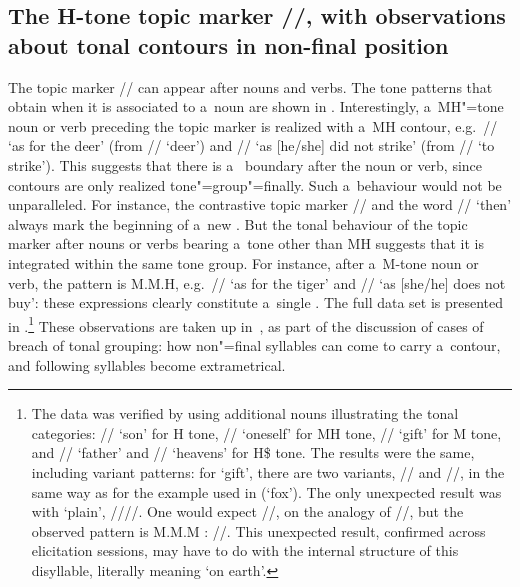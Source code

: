 \subsection[A~H-tone morpheme]{The H-tone topic marker //, with observations about tonal contours in non-final position}
\label{sec:theambivalentbehaviouroftheltonetopicmarker}
\largerpage%
The topic marker // can appear after nouns and verbs. The tone patterns that obtain when it is associated to a~noun are shown in . Interestingly, a~MH"=tone noun or verb preceding the topic marker is realized with a~MH contour, e.g.~//
‘as for the deer’ (from // ‘deer’) and // ‘as [he/she] did not strike’
(from // ‘to strike’). This suggests that there is a~ boundary after the noun or
verb, since contours are only realized tone"=group"=finally. Such a~behaviour would not be
unparalleled. For instance, the contrastive topic marker // and the word // ‘then’ always
mark the beginning of a~new . But the
tonal behaviour of the topic marker after nouns or verbs bearing a~tone other than MH suggests that it is integrated within the same tone
group. For instance, after a~M-tone noun or verb, the pattern is M.M.H, e.g.~// ‘as for
the tiger’ and // ‘as [she/he] does not buy’: these expressions clearly constitute a~single . The full data set is presented in .\footnote{The data was verified by using additional nouns
  illustrating the tonal categories: // ‘son’ for H tone, // ‘oneself’ for MH tone,
  // ‘gift’ for M tone, and // ‘father’ and // ‘heavens’ for H\$ tone. The results were the same, including variant patterns: for ‘gift’, there are two variants,
  // and //, in the same way as for the example used in  (‘fox’). The only
  unexpected result was with ‘plain’, ////. One would expect //, on the {analogy} of //, but the observed pattern is M.M.M : //. This
  unexpected result, confirmed across elicitation sessions, may have to do with the internal
  structure of this disyllable, literally meaning ‘on earth’.} These observations are taken up
  in~, as part of the discussion of cases of breach of
tonal grouping: how non"=final syllables can come to carry a~contour, and following syllables become
extrametrical. 
\clearpage


